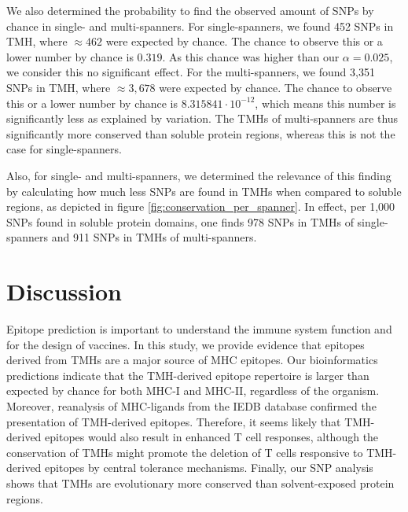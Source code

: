 We also determined the probability to find the 
observed amount of SNPs  by chance in single- and multi-spanners.
For single-spanners, we found 452 SNPs in TMH, where
$\approx462$ were expected by chance. 
The chance to observe this or a lower number by chance is 
$0.319$. As this chance was higher than our $\alpha = 0.025$,
we consider this no significant effect.
For the multi-spanners, we found 3,351 SNPs in TMH, where 
$\approx3,678$ were expected by chance. 
The chance to observe this or a lower number by chance is 
$8.315841 \cdot 10^{-12}$, 
which means this number is significantly less as explained by variation. The TMHs of multi-spanners are thus significantly more conserved than soluble protein regions, whereas this is not the case for single-spanners.

Also, for single- and multi-spanners, 
we determined the relevance of this finding by
calculating how much less SNPs are found in TMHs
when compared to soluble regions,
as depicted in figure \ref{fig:conservation_per_spanner}.
In effect, per 1,000 SNPs found in soluble protein domains, 
one finds 978 SNPs in TMHs 
of single-spanners
and 911 SNPs in TMHs of multi-spanners.

\section{Discussion}


Epitope prediction is important to understand the immune system function
and for the design of vaccines.
In this study, we provide evidence that epitopes
derived from TMHs are a major source of MHC epitopes. 
Our bioinformatics predictions indicate that the TMH-derived epitope repertoire is larger than expected by chance for both MHC-I and MHC-II, regardless of the organism. Moreover, reanalysis of MHC-ligands from the IEDB database confirmed the presentation of TMH-derived epitopes. Therefore, it seems likely that TMH-derived epitopes would also result in enhanced T cell responses, although the conservation of TMHs might promote the deletion of T cells responsive to TMH-derived epitopes by central tolerance mechanisms. Finally, our SNP analysis shows that TMHs are evolutionary more conserved 
than solvent-exposed protein regions.

